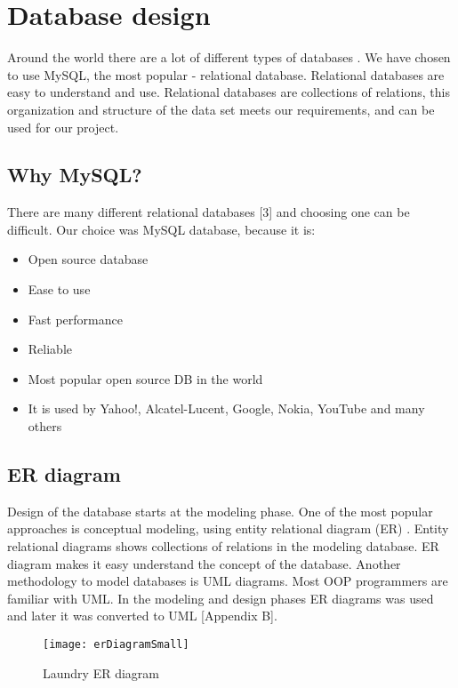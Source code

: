 %
\section{Database design}

Around the world there are a lot of different types of databases \cite{bib1}. We have chosen to use MySQL, the most popular - relational database. Relational databases are easy to understand \cite{bib2} and use. Relational databases are collections of relations, this organization and structure of the data set meets our requirements, and can be used for our project.

\subsection{Why MySQL?}

There are many different relational databases [3] and choosing one can be difficult. Our choice was MySQL database, because it is:

\begin{itemize}
	\item Open source database
	\item Ease to use
	\item Fast performance
	\item Reliable 
	\item Most popular open source DB in the world
	\item It is used by Yahoo!, Alcatel-Lucent, Google, Nokia, YouTube and many others
\end{itemize}

\subsection{ER diagram}

Design of the database starts at the modeling phase. One of the most popular approaches is conceptual modeling, using entity relational diagram (ER) \cite{bib4}. Entity relational diagrams shows collections of relations in the modeling database. ER diagram makes it easy understand the concept of the database. Another methodology to model databases is UML diagrams. Most OOP programmers are familiar with UML. In the modeling and design phases ER diagrams was used and later it was converted to UML [Appendix B].

\begin{figure}[h]
	\centering
		\texttt{[image: erDiagramSmall]}
	\caption{Laundry ER diagram}
	\label{fig:planning}
\end{figure}

